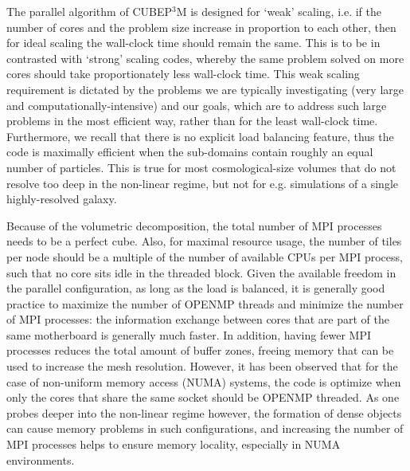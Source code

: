 \documentclass[useAMS,usenatbib]{mn2e}
\begin{document}
The parallel algorithm of {\small CUBEP$^3$M} is designed for `weak' 
scaling, i.e. if the number of cores and the problem size 
increase in proportion to each other, then for ideal scaling the 
wall-clock time should remain the same. This is to be in contrasted with `strong' 
scaling codes, whereby the same problem solved on more cores should take 
proportionately less wall-clock time. This weak scaling requirement 
is dictated by the problems we are typically investigating (very 
large and computationally-intensive) and our goals, which are to 
address such large problems in the most efficient way, rather than 
for the least wall-clock time. Furthermore, we recall that there is no explicit 
load balancing feature, thus the code is maximally efficient when the sub-domains
contain roughly an equal number of particles. This is true for most
cosmological-size volumes that do not resolve too deep in the non-linear regime, 
but not for e.g. simulations of a single highly-resolved galaxy. 

Because of the volumetric decomposition, the total number of {\small MPI} processes needs
to be a perfect cube. Also, for maximal resource usage, the number of tiles per node 
should be a multiple of the number of available {\small CPU}s per {\small MPI} process,
such that no core sits idle in the threaded block.
Given the available freedom in the parallel configuration, as long as the load is balanced, 
it is generally good practice to maximize the number of {\small OPENMP} threads and minimize the number of {\small MPI} processes:
the information exchange between cores that are part of the same motherboard is generally much faster.
In addition, having fewer {\small MPI} processes reduces the total amount of buffer zones, 
freeing memory that can be used to increase the mesh resolution. 
However, it has been observed that for the case of non-uniform memory access (NUMA) systems, 
the code is optimize when only the cores that share the same socket should be  {\small OPENMP} threaded.
As one probes deeper into the non-linear regime however, 
the formation of dense objects can cause memory problems in such configurations, and increasing 
the number of {\small MPI} processes helps to ensure memory locality,
especially in NUMA environments.


\end{document}

